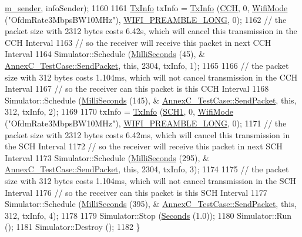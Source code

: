 \begin{DoxyCode}
      \hyperlink{classAnnexC__TestCase_a277f353900b6dbe1e7850814b9f26cdb}{m\_sender}, infoSender);
1160 
1161   \hyperlink{structns3_1_1TxInfo}{TxInfo} txInfo = \hyperlink{structns3_1_1TxInfo}{TxInfo} (\hyperlink{channel-manager_8h_a52d2f169cde2f6abe66ecc83f0d7ad80}{CCH}, 0, \hyperlink{classns3_1_1WifiMode}{WifiMode} (\textcolor{stringliteral}{"OfdmRate3MbpsBW10MHz"}), 
      \hyperlink{group__wifi_gga5e94a56cb338a14ffbbb19c6a41251eba12f3d9468d1630bd38bbef20df1e3eda}{WIFI\_PREAMBLE\_LONG}, 0);
1162   \textcolor{comment}{// the packet size with 2312 bytes costs 6.42s, which will cancel this transmission in the CCH Interval}
1163   \textcolor{comment}{// so the receiver will receive this packet in next CCH Interval}
1164   Simulator::Schedule (\hyperlink{group__timecivil_gaf26127cf4571146b83a92ee18679c7a9}{MilliSeconds} (45), &
      \hyperlink{classAnnexC__TestCase_a6ad361d48194ad49b3856a12db4d4ea7}{AnnexC\_TestCase::SendPacket}, \textcolor{keyword}{this}, 2304, txInfo, 1);
1165 
1166   \textcolor{comment}{// the packet size with 312 bytes costs 1.104ms, which will not cancel transmission in the CCH Interval}
1167   \textcolor{comment}{// so the receiver can this packet is this CCH Interval}
1168   Simulator::Schedule (\hyperlink{group__timecivil_gaf26127cf4571146b83a92ee18679c7a9}{MilliSeconds} (145), &
      \hyperlink{classAnnexC__TestCase_a6ad361d48194ad49b3856a12db4d4ea7}{AnnexC\_TestCase::SendPacket}, \textcolor{keyword}{this}, 312, txInfo, 2);
1169 
1170   txInfo = \hyperlink{structns3_1_1TxInfo}{TxInfo} (\hyperlink{channel-manager_8h_a456a1b730523e5d3b8a29fb227d10028}{SCH1}, 0, \hyperlink{classns3_1_1WifiMode}{WifiMode} (\textcolor{stringliteral}{"OfdmRate3MbpsBW10MHz"}), 
      \hyperlink{group__wifi_gga5e94a56cb338a14ffbbb19c6a41251eba12f3d9468d1630bd38bbef20df1e3eda}{WIFI\_PREAMBLE\_LONG}, 0);
1171   \textcolor{comment}{// the packet size with 2312 bytes costs 6.42ms, which will cancel this transmission in the SCH Interval}
1172   \textcolor{comment}{// so the receiver will receive this packet in next SCH Interval}
1173   Simulator::Schedule (\hyperlink{group__timecivil_gaf26127cf4571146b83a92ee18679c7a9}{MilliSeconds} (295), &
      \hyperlink{classAnnexC__TestCase_a6ad361d48194ad49b3856a12db4d4ea7}{AnnexC\_TestCase::SendPacket}, \textcolor{keyword}{this}, 2304, txInfo, 3);
1174 
1175   \textcolor{comment}{// the packet size with 312 bytes costs 1.104ms, which will not cancel transmission in the SCH Interval}
1176   \textcolor{comment}{// so the receiver can this packet is this SCH Interval}
1177   Simulator::Schedule (\hyperlink{group__timecivil_gaf26127cf4571146b83a92ee18679c7a9}{MilliSeconds} (395), &
      \hyperlink{classAnnexC__TestCase_a6ad361d48194ad49b3856a12db4d4ea7}{AnnexC\_TestCase::SendPacket}, \textcolor{keyword}{this}, 312, txInfo, 4);
1178 
1179   Simulator::Stop (\hyperlink{group__timecivil_ga33c34b816f8ff6628e33d5c8e9713b9e}{Seconds} (1.0));
1180   Simulator::Run ();
1181   Simulator::Destroy ();
1182 \}
\end{DoxyCode}


